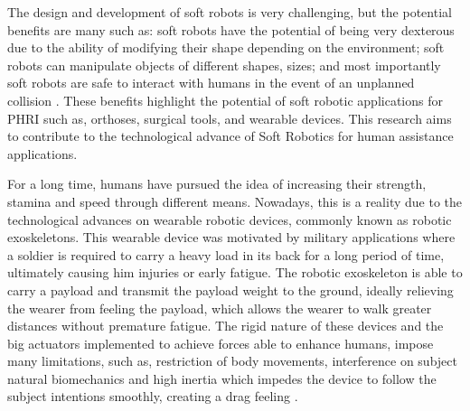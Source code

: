 The design and development of soft robots is very challenging, but the potential benefits are many such as: soft robots have the potential of being very dexterous due to the ability of modifying their shape depending on the environment; soft robots can manipulate objects of different shapes, sizes; and most importantly soft robots are safe to interact with humans in the event of an unplanned collision \cite{iida2011soft}. These benefits highlight the potential of soft robotic applications for PHRI such as, orthoses, surgical tools, and wearable devices. This research aims to contribute to the technological advance of Soft Robotics for human assistance applications.

For a long time, humans have pursued the idea of increasing their strength, stamina and speed through different means. Nowadays, this is a reality due to the technological advances on wearable robotic devices, commonly known as robotic exoskeletons. This wearable device was motivated by military applications where a soldier is required to carry a heavy load in its back for a long period of time, ultimately causing him injuries or early fatigue. The robotic exoskeleton is able to carry a payload and transmit the payload weight to the ground, ideally relieving the wearer from feeling the payload, which allows the wearer to walk greater distances without premature fatigue. The rigid nature of these devices and the big actuators implemented to achieve forces able to enhance humans, impose many limitations, such as, restriction of body movements, interference on subject natural biomechanics and high inertia which impedes the device to follow the subject intentions smoothly, creating a drag feeling \cite{asbeck2014stronger}.

